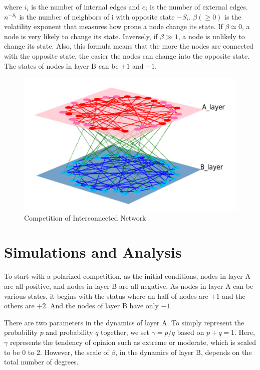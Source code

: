 \documentclass[english]{cccconf}
\begin{document}
where $i_i$ is the number of internal edges and $e_i$ is the number of external edges. $n^{-S_i}$ is the number of neighbors of i with opposite state $-S_i$. $\beta(\geq 0)$ is the volatility exponent that measures how prone a node change its state. If $\beta \simeq 0$, a node is very likely to change its state. Inversely, if $\beta \gg 1$, a node is unlikely to change its state. Also, this formula means that the more the nodes are connected with the opposite state, the easier the nodes can change into the opposite state.
The states of nodes in layer B can be $+1$ and $-1$. \\
\begin{figure}[!htb]
  \centering
  \includegraphics[width=\hsize]{FIG1.png}
  \caption{Competition of Interconnected Network}
  \label{Fig1}
\end{figure}


\section{Simulations and Analysis}
To start with a polarized competition, as the initial conditions,  nodes in layer A are all positive, and nodes in layer B are all negative. As nodes in layer A can be various states, it begins with the status where an half of nodes are $+1$ and the others are $+2$. And the nodes of layer B have only $-1$. 

There are two parameters in the dynamics of layer A. To simply represent the probability $p$ and probability $q$ together, we set $\gamma = p/q$ based on $p+q=1$. Here, $\gamma$ represents the tendency of opinion such as extreme or moderate, which is scaled to be 0 to 2. However, the scale of $\beta$, in the dynamics of layer B, depends on the total number of degrees. 
\end{document}
